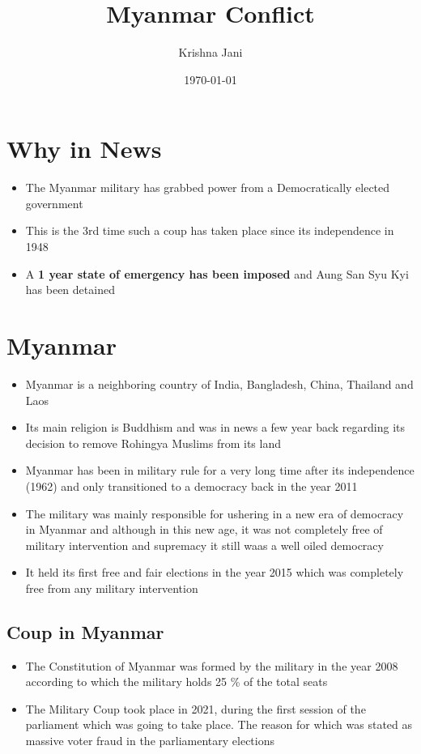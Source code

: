 \documentclass[11pt]{article}
\author{Krishna Jani}
\date{\today}
\title{Myanmar Conflict}
\begin{document}
\maketitle
\tableofcontents


\section{Why in News}
\label{sec:org03b8270}
\begin{itemize}
\item The Myanmar military has grabbed power from a Democratically elected government
\item This is the 3rd time such a coup has taken place since its independence in 1948
\item A \textbf{1 year state of emergency has been imposed} and Aung San Syu Kyi has been detained
\end{itemize}

\section{Myanmar}
\label{sec:org6e62d0b}
\begin{itemize}
\item Myanmar is a neighboring country of India, Bangladesh, China, Thailand and Laos
\item Its main religion is Buddhism and was in news a few year back regarding its decision to remove Rohingya Muslims from its land
\item Myanmar has been in military rule for a very long time after its independence (1962) and only transitioned to a democracy back  in the year 2011
\item The military was mainly responsible for ushering in a new era of democracy in Myanmar and although in this new age, it was not completely free of military intervention and supremacy it still waas a well oiled democracy
\item It held its first free and fair elections in the year 2015 which was completely free from any military intervention
\end{itemize}

\subsection{Coup  in Myanmar}
\label{sec:org0a444ba}
\begin{itemize}
\item The Constitution of Myanmar was formed by the military in the year 2008 according to which the military holds 25 \% of the total seats
\item The Military Coup took place in 2021, during the first session of the parliament which was going to take place. The reason for which was stated as massive voter fraud in the parliamentary elections
\end{itemize}
\end{document}
